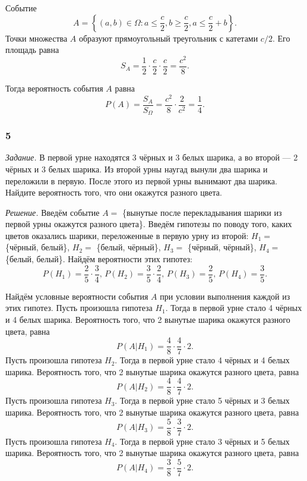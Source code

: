 Событие
$$A = \left\{ \left( a, b \right) \in \Omega: a \leq \frac{c}{2}, b \geq \frac{c}{2}, a \leq \frac{c}{2} + b \right\}.$$
Точки множества $A$ образуют прямоугольный треугольник с катетами $c/2$.
Его площадь равна
$$S_A =
\frac{1}{2} \cdot \frac{c}{2} \cdot \frac{c}{2} =
\frac{c^2}{8}.$$

Тогда вероятность события $A$ равна
$$P \left( A \right) =
\frac{S_A}{S_{ \Omega }} =
\frac{c^2}{8} \cdot \frac{2}{c^2} =
\frac{1}{4}.$$

\subsubsection*{5}

\textit{Задание.} В первой урне находятся 3 чёрных и 3 белых шарика, а во второй --- 2 чёрных и 3 белых шарика.
Из второй урны наугад вынули два шарика и переложили в первую.
После этого из первой урны вынимают два шарика.
Найдите вероятность того, что они окажутся разного цвета.

\textit{Решение.} Введём событие $A =$ \{вынутые после перекладывания шарики из первой урны окажутся разного цвета\}.
Введём гипотезы по поводу того,
каких цветов оказались шарики,
переложенные в первую урну из второй: $H_1 =$ \{чёрный, белый\}, $H_2 =$ \{белый, чёрный\}, $H_3 =$ \{чёрный, чёрный\}, $H_4 =$ \{белый, белый\}.
Найдём вероятности этих гипотез:
$$P \left( H_1 \right) =
\frac{2}{5} \cdot \frac{3}{4}, \,
P \left( H_2 \right) =
\frac{3}{5} \cdot \frac{2}{4}, \,
P \left( H_3 \right) =
\frac{2}{5}, \,
P \left( H_4 \right) =
\frac{3}{5}.$$

Найдём условные вероятности события $A$ при условии выполнения каждой из этих гипотез.
Пусть произошла гипотеза $H_1$.
Тогда в первой урне стало 4 чёрных и 4 белых шарика.
Вероятность того, что 2 вынутые шарика окажутся разного цвета, равна
$$P \left( \left. A \right| H_1 \right) =
\frac{4}{8} \cdot \frac{4}{7} \cdot 2.$$
Пусть произошла гипотеза $H_2$.
Тогда в первой урне стало 4 чёрных и 4 белых шарика.
Вероятность того, что 2 вынутые шарика окажутся разного цвета, равна
$$P \left( \left. A \right| H_2 \right) =
\frac{4}{8} \cdot \frac{4}{7} \cdot 2.$$
Пусть произошла гипотеза $H_3$.
Тогда в первой урне стало 5 чёрных и 3 белых шарика.
Вероятность того, что 2 вынутые шарика окажутся разного цвета, равна
$$P \left( \left. A \right| H_3 \right) =
\frac{5}{8} \cdot \frac{3}{7} \cdot 2.$$
Пусть произошла гипотеза $H_4$.
Тогда в первой урне стало 3 чёрных и 5 белых шарика.
Вероятность того, что 2 вынутые шарика окажутся разного цвета, равна
$$P \left( \left. A \right| H_4 \right) =
\frac{3}{8} \cdot \frac{5}{7} \cdot 2.$$

